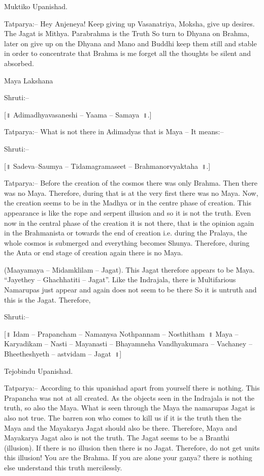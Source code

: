 Muktiko Upanishad.

Tatparya:– Hey Anjeneya! Keep giving up Vasanatriya, Moksha, give up desires. The Jagat is Mithya. Parabrahma is the Truth So turn to Dhyana on Brahma, later on give up on the Dhyana and Mano and Buddhi keep them still and stable in order to concentrate that Brahma is me forget all the thoughts be silent and absorbed.

Maya Lakshana

Shruti:–

[॥ Adimadhyavasaneshi – Yaama – Samaya~॥.]

Tatparya:– What is not there in Adimadyas that is Maya – It means:–

Shruti:–

[॥ Sadeva–Saumya – Tidamagramaseet – Brahmanorvyaktaha~॥.]

Tatparya:– Before the creation of the cosmos there was only Brahma. Then there was no Maya. Therefore, during that is at the very first there was no Maya. Now, the creation seems to be in the Madhya or in the centre phase of creation. This appearance is like the rope and serpent illusion and so it is not the truth. Even now in the central phase of the creation it is not there, that is the opinion again in the Brahmanista or towards the end of creation i.e. during the Pralaya, the whole cosmos is submerged and everything becomes Shunya. Therefore, during the Anta or end stage of creation again there is no Maya.

(Maayamaya – Midamklilam – Jagat). This Jagat therefore appears to be Maya. “Jayethey – Ghachhatiti – Jagat”. Like the Indrajala, there is Multifarious Namarupas just appear and again does not seem to be there So it is untruth and this is the Jagat. Therefore,

Shruti:–

[॥ Idam – Prapancham – Namanysa Nothpannam – Nosthitham~॥ Maya – Karyadikam – Nasti – Mayanasti – Bhayamneha Vandhyakumara – Vachaney – Bheetheshyeth – astvidam – Jagat~॥]

Tejobindu Upanishad.

Tatparya:– According to this upanishad apart from yourself there is nothing. This Prapancha was not at all created. As the objects seen in the Indrajala is not the truth, so also the Maya. What is seen through the Maya the namarupas Jagat is also not true. The barren son who comes to kill us if it is the truth then the Maya and the Mayakarya Jagat should also be there. Therefore, Maya and Mayakarya Jagat also is not the truth. The Jagat seems to be a Branthi (illusion). If there is no illusion then there is no Jagat. Therefore, do not get units this illusion! You are the Brahma. If you are alone your ganya? there is nothing else understand this truth mercilessly.

